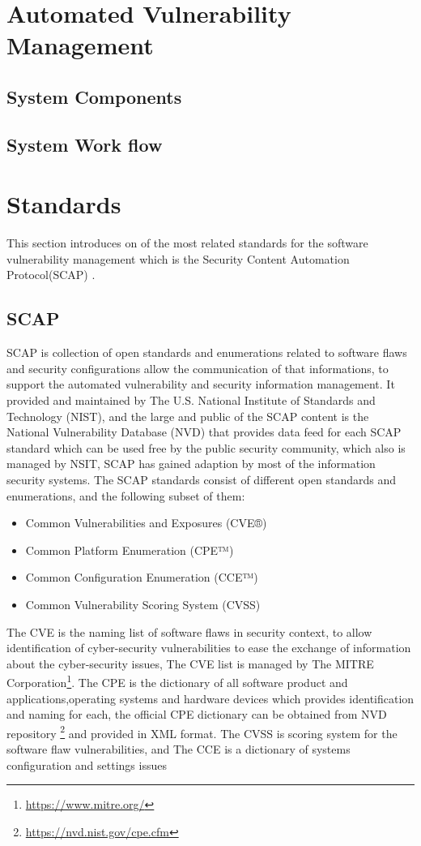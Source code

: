 \documentclass{llncs}
\begin{document}
\section{Automated Vulnerability Management}

\subsection{System Components}
\subsection{System Work flow}

\newpage
\section{Standards}
This section introduces on of the most related standards for the software vulnerability management which is the Security Content Automation Protocol(SCAP) \cite{scap}.


\subsection{SCAP}
 SCAP is collection of open standards and enumerations related to software flaws and security configurations allow the communication of that informations, to support the automated vulnerability and security information management.    
 It provided and maintained by The U.S. National Institute of Standards and Technology (NIST)\cite{nsit}, and the large and public of the SCAP content is the National Vulnerability Database (NVD)\cite{nvd} that provides data feed for each SCAP standard which can be used free by the public security community, which also is managed by NSIT, SCAP has gained adaption by most of the information security systems.  
 The SCAP standards consist of different open standards and enumerations, and the following subset of them:
 
 \begin{itemize}
 \item Common Vulnerabilities and Exposures (CVE®)
 \item Common Platform Enumeration (CPE™)
 \item  Common Configuration Enumeration (CCE™)
 \item Common Vulnerability Scoring System (CVSS)
 \end{itemize}
   
The CVE is the naming list of software flaws in security context, to allow identification of cyber-security vulnerabilities to ease the exchange of information about the cyber-security issues, The CVE list is managed by The MITRE Corporation\footnote{\url{https://www.mitre.org/}}. The CPE is the dictionary of all software product and applications,operating systems and hardware devices which provides identification and naming for each, the official CPE dictionary can be obtained from NVD repository \footnote{\url{https://nvd.nist.gov/cpe.cfm}} and provided in XML format. The CVSS is scoring system for the software flaw vulnerabilities, and The CCE is  a dictionary of systems configuration and settings issues \cite{scap_doc}
\end{document}
